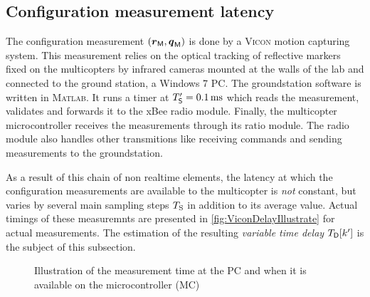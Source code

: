 

\subsection{Configuration measurement latency}
The configuration measurement $(\boldsymbol{r}_{\mathsf{M}}, \boldsymbol{q}_{\mathsf{M}})$ is done by a \textsc{Vicon} motion capturing system.
This measurement relies on the optical tracking of reflective markers fixed on the multicopters by infrared cameras mounted at the walls of the lab and connected to the ground station, a Windows 7 PC.
The groundstation software is written in \textsc{Matlab}.
It runs a timer at $T'_{\mathsf{S}} = 0.1\,\text{ms}$ which reads the measurement, validates and forwards it to the xBee radio module.
Finally, the multicopter microcontroller receives the measurements through its ratio module.
The radio module also handles other transmitions like receiving commands and sending measurements to the groundstation.

As a result of this chain of non realtime elements, the latency at which the configuration measurements are available to the multicopter is \textit{not} constant, but varies by several main sampling steps $T_{\mathrm{S}}$ in addition to its average value.
Actual timings of these measuremnts are presented in \autoref{fig:ViconDelayIllustrate} for actual measurements.
The estimation of the resulting \textit{variable time delay} $T_{\mathsf{D}}[k']$ is the subject of this subsection.

\begin{figure}[htb]
 \centering
 
 \caption{Illustration of the measurement time at the PC and when it is available on the microcontroller (MC)}
 \label{fig:ViconDelayClocks}
\end{figure}


